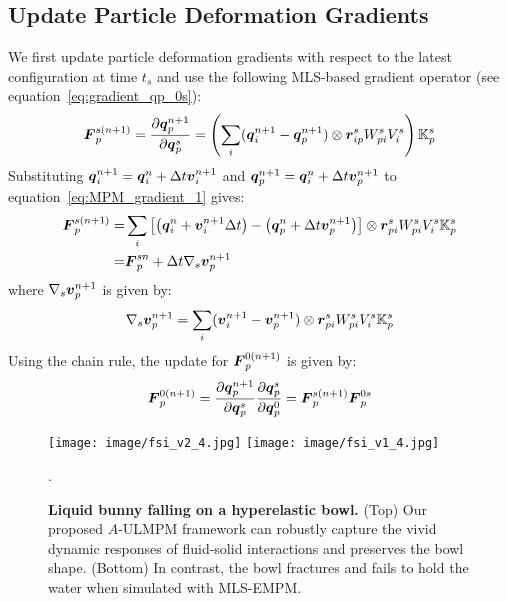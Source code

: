 \subsection{Update Particle Deformation Gradients}
We first update particle deformation gradients with respect to the latest configuration at time $t_s$ and use the following MLS-based gradient operator (see equation~\eqref{eq:gradient_qp_0s}):
\begin{equation}
    \boldsymbol{F}_p^{s(n+1)}=\frac{\partial\boldsymbol{q}^{n+1}_p}{\partial\boldsymbol{q}^s_p}=
    \left(\sum_{i}(\boldsymbol{q}_i^{n+1}-\boldsymbol{q}_p^{n+1})\otimes \boldsymbol{r}_{ip}^s W_{pi}^s V_i^s\right)\mathbb{K}_p^s
\label{eq:MPM_gradient_1}
\end{equation}
Substituting $\boldsymbol{q}_i^{n+1}=\boldsymbol{q}_i^n+\Delta t\boldsymbol{v}_i^{n+1}$ and $\boldsymbol{q}_p^{n+1}=\boldsymbol{q}_i^n+\Delta t\boldsymbol{v}_p^{n+1}$ to equation~\eqref{eq:MPM_gradient_1} gives:
\begin{eqnarray}
\begin{split}
  \boldsymbol{F}_p^{s(n+1)}=  &\sum_i\left[\left(\boldsymbol{q}_i^n+\boldsymbol{v}_i^{n+1}\Delta t\right)-\left(\boldsymbol{q}_p^n+\Delta t\boldsymbol{v}_p^{n+1}\right)\right]\otimes \boldsymbol{r}_{pi}^s W_{pi}^s V_i^s \mathbb{K}_p^s\\
   =  &\boldsymbol{F}_p^{sn}+\Delta t\nabla_s\boldsymbol{v}_p^{n+1}\\
\end{split}
\label{eq:MPM_gradient_s(n+1)}
\end{eqnarray}
where $\nabla_s\boldsymbol{v}_p^{n+1}$ is given by:
\begin{equation}
\nabla_s\boldsymbol{v}_p^{n+1}=\sum_i(\boldsymbol{v}_i^{n+1}-\boldsymbol{v}_p^{n+1})\otimes \boldsymbol{r}_{pi}^s W_{pi}^s V_i^s \mathbb{K}_p^s
\label{eq:gradientVp}
\end{equation}
Using the chain rule, the update for $\boldsymbol{F}_p^{0(n+1)}$ is given by:
\begin{equation}
    \boldsymbol{F}_p^{0(n+1)}=\frac{\partial \boldsymbol{q}_p^{n+1}}{\partial\boldsymbol{q}_p^{s}}\frac{\partial\boldsymbol{q}_p^{s}}{\partial\boldsymbol{q}_p^{0}}
    =\boldsymbol{F}_p^{s(n+1)}\boldsymbol{F}_p^{0s}
\end{equation}

\begin{figure*}
    \centering
    \texttt{[image: image/fsi\_v2\_4.jpg]}
    \texttt{[image: image/fsi\_v1\_4.jpg]}
    \vspace{-7.5mm}
    \caption{\textbf{Liquid bunny falling on a hyperelastic bowl.} (Top) Our proposed $A$-ULMPM framework can robustly capture the vivid dynamic responses of fluid-solid interactions and preserves the bowl shape. (Bottom) In contrast, the bowl fractures and fails to hold the water when simulated with MLS-EMPM.}.
    \label{fig:FSI}
    \vspace{-6mm}
\end{figure*}

